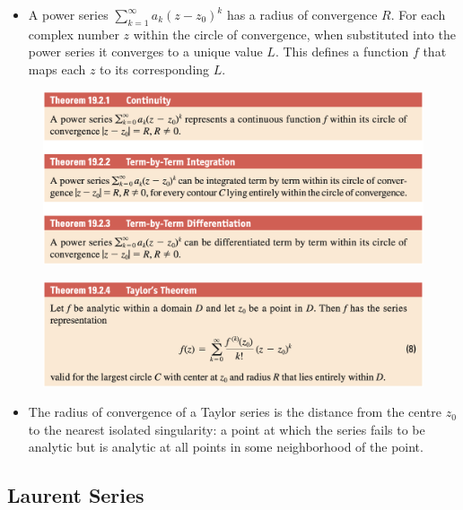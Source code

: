 \documentclass{article}
\begin{document}
\begin{itemize}
  \item A power series $\sum_{k = 1}^\infty a_k (z - z_0)^k$ has a radius of convergence $R$. For each complex number $z$ within the circle of convergence, when substituted into the power series it converges to a unique value $L$. This defines a function $f$ that maps each $z$ to its corresponding $L$.
\end{itemize}

\begin{figure}[H]
  \centering
  \includegraphics[width=\textwidth]{power-series-function-properties}
\end{figure}

\begin{figure}[H]
  \centering
  \includegraphics[width=\textwidth]{taylors-theorem}
\end{figure}

\begin{itemize}
  \item The radius of convergence of a Taylor series is the distance from the centre $z_0$ to the nearest isolated singularity: a point at which the series fails to be analytic but is analytic at all points in some neighborhood of the point.
\end{itemize}

\subsection{Laurent Series}
\end{document}
